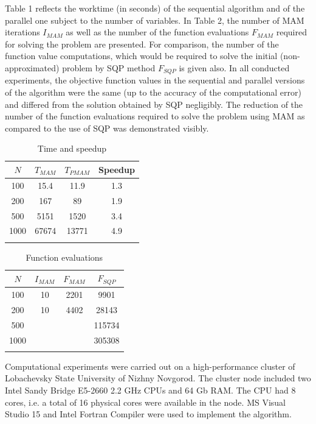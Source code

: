 \documentclass[runningheads,a4paper]{llncs}
\begin{document}
Table 1 reflects the worktime (in seconds) of the sequential algorithm and of the parallel one subject to the number of variables. In Table 2, the number of MAM iterations $I_{MAM}$ as well as the number of the function evaluations $F_{MAM}$ required for solving the problem are presented. For comparison, the number of the function value computations, which would be required to solve the initial (non-approximated) problem by SQP method $F_{SQP}$ is given also. In all conducted experiments, the objective function values in the sequential and parallel versions of the algorithm were the same (up to the accuracy of the computational error) and differed from the solution obtained by SQP negligibly. The reduction of the number of the function evaluations required to solve the problem using MAM as compared to the use of SQP was demonstrated 
visibly.

\begin{table}
	\caption{Time and speedup}
	\label{tab:1}
	\center
	\begin{tabular}{cccc}
		\hline\noalign{\smallskip}
		$N$ & $T_{MAM}$ & $T_{PMAM}$ & Speedup \\
		\hline\noalign{\smallskip}
		100 & 15.4 & 11.9 & 1.3  \\
		200 & 167 &  89 &  1.9 \\
		500 & 5151 &  1520 & 3.4  \\
		1000 & 67674 &  13771 & 4.9  \\
		\noalign{\smallskip}\hline
	\end{tabular}
\end{table}

\begin{table}
	\caption{Function evaluations}
	\label{tab:2}
	\center
	\begin{tabular}{cccc}
		\hline\noalign{\smallskip}
		$N$ & $I_{MAM}$  & $F_{MAM}$ & $F_{SQP}$ \\
		\hline\noalign{\smallskip}
		100 & 10 &  2201 & 9901 \\
		200 & 10 &  4402 & 28143 \\
		500 &  &   &  115734 \\
		1000 &  &   & 305308 \\
		\noalign{\smallskip}\hline
	\end{tabular}
\end{table}

Computational experiments were carried out on a high-performance cluster of Lobachevsky State University of Nizhny Novgorod. The cluster node included two Intel Sandy Bridge E5-2660 2.2 GHz CPUs and 64 Gb RAM. The CPU had 8 cores, i.e. a total of 16 physical cores were available in the node. MS Visual Studio 15 and Intel Fortran Compiler were used to implement the algorithm.
\end{document}
